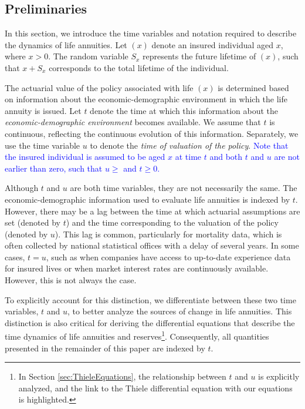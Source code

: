 \documentclass[12pt]{article}
\begin{document}
\subsection{Preliminaries}\label{preliminaries}

In this section, we introduce the time variables and notation required to describe the dynamics of life annuities. Let $(x)$ denote an insured individual aged $x$, where $x > 0$. The random variable \( S_x \) represents the future lifetime of $(x)$, such that \( x + S_x \) corresponds to the total lifetime of the individual. 

The actuarial value of the policy associated with life $(x)$ is determined based on information about the economic-demographic environment in which the life annuity is issued. Let \(t\) denote the  time at which this information about the \textit{economic-demographic environment} becomes available. We assume that \(t\) is continuous, reflecting the continuous evolution of this information. Separately, we use  the time variable \(u\) to denote the \textit{time of valuation of the policy}. \textcolor{blue}{Note that the insured individual is assumed to be aged $x$ at time $t$ and both \(t\) and \(u\) are not earlier than zero, such that $u\geq$ and $t\geq 0$.}

Although \( t \) and \( u \) are both time variables, they are not necessarily the same. The economic-demographic information used to evaluate life annuities is indexed by \( t \). However, there may be a lag between the time at which actuarial assumptions are set (denoted by \( t \)) and the time corresponding to the valuation of the policy (denoted by \( u \)). This lag is common, particularly for mortality data, which is often collected by national statistical offices with a delay of several years. In some cases, \( t = u \), such as when companies have access to up-to-date experience data for insured lives or when market interest rates are continuously available. However, this is not always the case.

To explicitly account for this distinction, we differentiate between these two time variables, \( t \) and \( u \), to better analyze the sources of change in life annuities. This distinction is also critical for deriving the differential equations that describe the time dynamics of life annuities and reserves\footnote{In Section \ref{sec:ThieleEquations}, the relationship between \( t \) and \( u \) is explicitly analyzed, and the link to the Thiele differential equation with our equations is highlighted.}. Consequently, all quantities presented in the remainder of this paper are indexed by \( t \).
\end{document}
